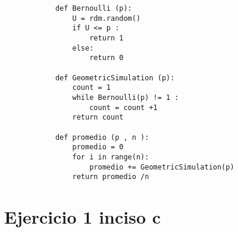 \documentclass{article}
\begin{document}
\begin{flushleft}
\begin{verbatim}
            def Bernoulli (p):
                U = rdm.random() 
                if U <= p :
                    return 1 
                else:
                    return 0
            
            def GeometricSimulation (p):
                count = 1
                while Bernoulli(p) != 1 :
                    count = count +1 
                return count 
            
            def promedio (p , n ):
                promedio = 0 
                for i in range(n):
                    promedio += GeometricSimulation(p) 
                return promedio /n    
        \end{verbatim}
        
            
    \end{flushleft}



    \section*{Ejercicio 1 inciso c }
    
\end{document}
